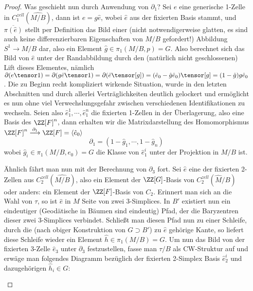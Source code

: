 \begin{proof}
	Was geschieht nun durch Anwendung von $\partial_1$? Sei $e$ eine generische 1-Zelle in $C_1^{zell}(\widehat{ M/B})$, dann ist $e=g\hat e$, wobei $\hat e$ aus der fixierten Basis stammt, und $\overline{\pi(\hat e)}$ stellt per Definition das Bild einer (nicht notwendigerweise glatten, es sind auch keine differenzierbaren Eigenschaften von $M/B$ gefordert!) Abbildung $S^1 \to M/B$ dar, also ein Element $\hat g \in \pi_1(M/B,p) = G$. Also berechnet sich das Bild von $\hat e$ unter der Randabbildung durch den (natürlich nicht geschlossenen) Lift dieses Elementes, nämlich $\partial(e\tensor 1)=\partial(g \hat e \tensor 1) = \partial(\hat e \tensor [g])= (\hat e_0 - \hat g \hat e_0)\tensor [g]= (1-\hat g)g\hat e_0 $. Die zu Beginn recht kompliziert wirkende Situation, wurde in den letzten Abschnitten und durch allerlei Verträglichkeiten deutlich gelockert und ermöglicht es nun ohne viel Verwechslungsgefahr zwischen verschiedenen Identifikationen zu wechseln. Seien also $\hat e_1^1 ,\cdots, \hat e_1^n$ die fixierten 1-Zellen in der Überlagerung, also eine Basis des $\ZZ[F]^n$, dann erhalten wir die Matrixdarstellung des Homomorphismus $\ZZ[F]^n \stackrel {\partial_1} \longrightarrow \ZZ[F]=\langle \hat e_0\rangle$
	\[
		\partial_1 = (1-\hat g_1, \cdots , 1- \hat g_n) 
	\]
	wobei $\hat g_i \in \pi_1(M/B,e_0)=G$ die Klasse von $\hat e_1^i$ unter der Projektion in $M/B$ ist.

	Ähnlich fährt man nun mit der Berechnung von $\partial_3$ fort. Sei $\hat e$ eine der fixierten 2-Zellen aus $C_2^{zell}(\widehat{ M/B})$, also ein Element der $\ZZ[G]$-Basis von $C_2^{zell}(\widehat M/B)$ oder anders: ein Element der $\ZZ[F]$-Basis von $C_2$. Erinnert man sich an die Wahl von $\tau$, so ist $\hat e$ in $M$ Seite von zwei 3-Simplices. In $B'$ existiert nun ein eindeutiger (Geodätische in Bäumen sind eindeutig) Pfad, der die Baryzentren dieser zwei 3-Simplices verbindet. Schließt man diesen Pfad nun zu einer Schleife, durch die (nach obiger Konstruktion von $G\supset B'$) zu $\hat e$ gehörige Kante, so liefert diese Schleife wieder ein Element $\hat h \in \pi_1(M/B)=G$. Um nun das Bild von der fixierten 3-Zelle $\hat e_3$ unter $\partial_3$ festzustellen, fasse man $\tau/B$ als CW-Struktur auf und erwäge man folgendes Diagramm bezüglich der fixierten 2-Simplex Basis $\hat e_2^i$ und dazugehörigen $\hat h_i \in G$:
	
\begin{center}


\end{center}
\end{proof}
